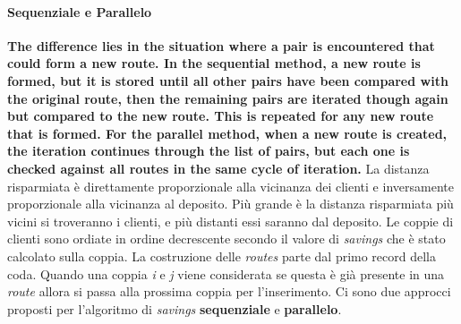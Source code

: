 \documentclass[]{article}
\begin{document}
\paragraph{Sequenziale e Parallelo } \hfill
\textbf{The difference lies in the situation where a pair is encountered that
	could form a new route. In the sequential method, a new route is
	formed, but it is stored until all other pairs have been compared with
	the original route, then the remaining pairs are iterated though again
	but compared to the new route. This is repeated for any new route that
	is formed. For the parallel method, when a new route is created, the
	iteration continues through the list of pairs, but each one is checked
	against all routes in the same cycle of iteration.}
La distanza risparmiata è direttamente proporzionale alla vicinanza dei clienti e inversamente proporzionale alla vicinanza al deposito.
Più grande è la distanza risparmiata più vicini si troveranno i clienti, e più distanti essi saranno dal deposito.
Le coppie di clienti sono ordiate in ordine decrescente secondo il valore di \emph{savings} che è stato calcolato sulla coppia.
La costruzione delle \emph{routes} parte dal primo record della coda. Quando una coppia \emph{i}  e \emph{j} viene considerata se questa è già presente in una \emph{route} allora si passa alla prossima coppia per l'inserimento.
Ci sono due approcci proposti per l'algoritmo di \emph{savings} \textbf{sequenziale}  e \textbf{parallelo}.
\end{document}
